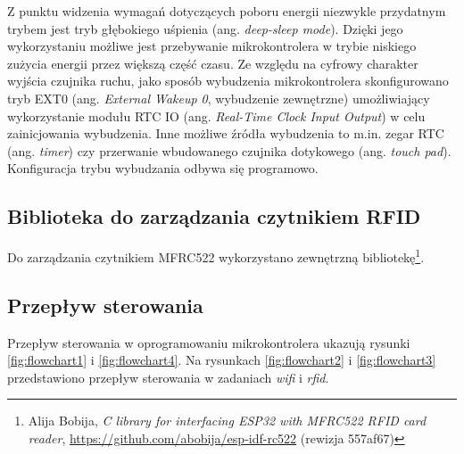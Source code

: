             Z punktu widzenia wymagań dotyczących poboru energii niezwykle przydatnym trybem jest tryb głębokiego uśpienia (ang. \textit{deep-sleep mode}). Dzięki jego wykorzystaniu możliwe jest przebywanie mikrokontrolera w trybie niskiego zużycia energii przez większą część czasu. Ze względu na cyfrowy charakter wyjścia czujnika ruchu, jako sposób wybudzenia mikrokontrolera skonfigurowano tryb EXT0 (ang. \textit{External Wakeup 0}, wybudzenie zewnętrzne) umożliwiający wykorzystanie modułu RTC IO (ang. \textit{Real-Time Clock Input Output}) w celu zainicjowania wybudzenia. Inne możliwe źródła wybudzenia to m.in. zegar RTC (ang. \textit{timer}) czy przerwanie wbudowanego czujnika dotykowego (ang. \textit{touch pad}). Konfiguracja trybu wybudzania odbywa się programowo.

        \subsection{Biblioteka do zarządzania czytnikiem RFID}
        \label{sub:rfid_lib}

            Do zarządzania czytnikiem MFRC522 wykorzystano zewnętrzną bibliotekę\footnote{Alija Bobija, \textit{C library for interfacing ESP32 with MFRC522 RFID card reader}, \url{https://github.com/abobija/esp-idf-rc522} (rewizja 557af67)}.

        \subsection{Przepływ sterowania}

            Przepływ sterowania w oprogramowaniu mikrokontrolera ukazują rysunki \ref{fig:flowchart1} i \ref{fig:flowchart4}. Na rysunkach \ref{fig:flowchart2} i \ref{fig:flowchart3} przedstawiono przepływ sterowania w zadaniach \textit{wifi} i \textit{rfid}.

